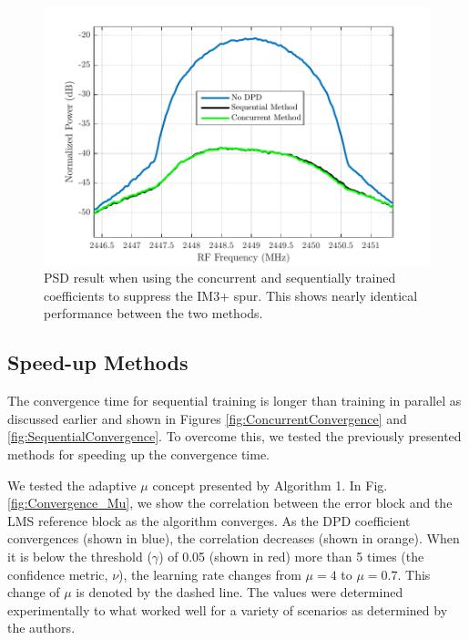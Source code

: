 \begin{figure}[t!] 
\centering
\includegraphics[width=0.9\columnwidth]{Figures/IterativeSpectrumvsConcurrent}
\caption{PSD result when using the concurrent and sequentially trained coefficients to suppress the IM3+ spur. 
	This shows nearly identical performance between the two methods.}
\label{fig:IterativeSpectrumvsConcurrent}
\vspace{-10pt}
\end{figure}

\subsection{Speed-up Methods}
The convergence time for sequential training is longer than training in parallel as discussed earlier and shown in Figures \ref{fig:ConcurrentConvergence} and \ref{fig:SequentialConvergence}. 
To overcome this, we tested the previously presented methods for speeding up the convergence time.

We tested the adaptive $\mu$ concept presented by Algorithm 1. 
In Fig. \ref{fig:Convergence_Mu}, we show the correlation between the error block and the LMS reference block as the algorithm converges. 
As the DPD coefficient convergences (shown in blue), the correlation decreases (shown in orange). 
When it is below the threshold ($\gamma$) of 0.05 (shown in red) more than 5 times (the confidence metric, $\nu$), the learning rate changes from $\mu = 4$ to $\mu = 0.7$. 
This change of $\mu$ is denoted by the dashed line. 
The values were determined experimentally to what worked well for a variety of scenarios as determined by the authors. 

